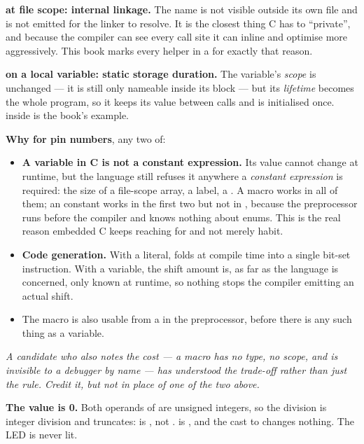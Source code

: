 \textbf{ at file scope: internal linkage.} The name is not visible outside its own
 file and is not emitted for the linker to resolve. It is the closest thing C has to
``private'', and because the compiler can see every call site it can inline and optimise more
aggressively. This book marks every helper in a   for exactly that
reason. 

\textbf{ on a local variable: static storage duration.} The variable's \emph{scope} is
unchanged --- it is still only nameable inside its block --- but its \emph{lifetime} becomes the
whole program, so it keeps its value between calls and is initialised once.
 inside  is the book's example.

\textbf{Why  for pin numbers}, any two of:
\begin{itemize}
  \item \textbf{A  variable in C is not a constant expression.} Its value cannot change
    at runtime, but the language still refuses it anywhere a \emph{constant expression} is
    required: the size of a file-scope array, a  label, a . A macro works in
    all of them; an  constant works in the first two but not in , because the
    preprocessor runs before the compiler and knows nothing about enums. This is the real reason
    embedded C keeps reaching for  and not merely habit.
  \item \textbf{Code generation.} With  a literal,  folds at
    compile time into a single bit-set instruction. With  a 
    variable, the shift amount is, as far as the language is concerned, only known at runtime, so
    nothing stops the compiler emitting an actual shift.
  \item The macro is also usable from a  in the preprocessor, before there is any such
    thing as a variable.
\end{itemize}

\textit{A candidate who also notes the cost --- a macro has no type, no scope, and is invisible to
a debugger by name --- has understood the trade-off rather than just the rule. Credit it, but not
in place of one of the two above.}

\textbf{The value is 0.} Both operands of \code{/} are unsigned integers, so the division is
integer division and truncates:  is , not .
 is , and the cast to  changes nothing. The LED is never lit.

